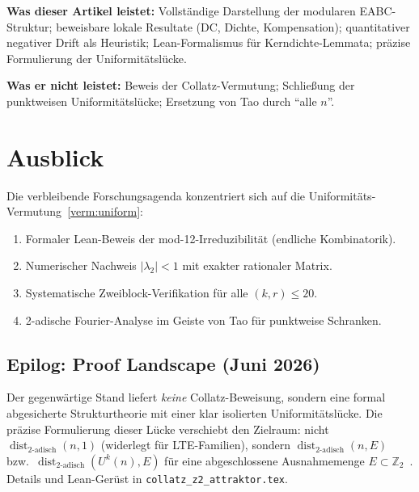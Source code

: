 \documentclass[12pt,a4paper]{article}
\newcommand{\Ztwo}{\mathbb{Z}_2}
\newcommand{\disttwo}{\operatorname{dist}_{2\text{-adisch}}}
\begin{document}
\begin{tcolorbox}[kern]
\textbf{Was dieser Artikel leistet:} Vollständige Darstellung der modularen
EABC-Struktur; beweisbare lokale Resultate (DC, Dichte, Kompensation);
quantitativer negativer Drift als Heuristik; Lean-Formalismus für
Kerndichte-Lemmata; präzise Formulierung der Uniformitätslücke.

\textbf{Was er nicht leistet:} Beweis der Collatz-Vermutung; Schließung
der punktweisen Uniformitätslücke; Ersetzung von Tao durch ``alle $n$''.
\end{tcolorbox}

\section{Ausblick}
\label{sec:ausblick}

Die verbleibende Forschungsagenda konzentriert sich auf die
Uniformitäts-Vermutung~\ref{verm:uniform}:
\begin{enumerate}
  \item Formaler Lean-Beweis der mod-12-Irreduzibilität (endliche Kombinatorik).
  \item Numerischer Nachweis $|\lambda_2| < 1$ mit exakter rationaler Matrix.
  \item Systematische Zweiblock-Verifikation für alle $(k,r) \leq 20$.
  \item 2-adische Fourier-Analyse im Geiste von Tao für punktweise Schranken.
\end{enumerate}

\subsection{Epilog: Proof Landscape (Juni 2026)}

\begin{tcolorbox}[kern,title={Kernaussage}]
Der gegenwärtige Stand liefert \emph{keine} Collatz-Beweisung, sondern eine
formal abgesicherte Strukturtheorie mit einer klar isolierten
Uniformitätslücke.
Die präzise Formulierung dieser Lücke verschiebt den Zielraum: nicht
$\disttwo(n,1)$ (widerlegt für LTE-Familien), sondern $\disttwo(n,E)$ bzw.\
$\disttwo(U^k(n),E)$ für eine abgeschlossene Ausnahmemenge
$E\subset\Ztwo$~\cite{BernsteinLagarias1996,Rozier2019}.
Details und Lean-Gerüst in \texttt{collatz\_z2\_attraktor.tex}.
\end{tcolorbox}
\end{document}
